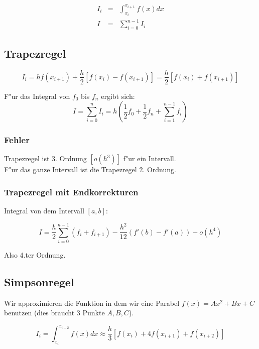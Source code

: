 \documentclass[german, 10pt, a4paper, twocolumn]{scrartcl}
\begin{document}
\begin{eqnarray}
	I_i &	= &	\int^{x_{i+1}}_{x_i} f(x) dx \nonumber \\
	I &	= &	\sum^{n-1}_{i=0} I_i \nonumber
\end{eqnarray}

\subsection{Trapezregel}

\begin{displaymath}
	I_i = h f(x_{i+1})+\frac{h}{2}[f(x_i)-f(x_{i+1})]= \frac{h}{2}[f(x_i)+f(x_{i+1})]
\end{displaymath}

F"ur das Integral von $f_0$ bis $f_n$ ergibt sich:
\begin{displaymath}
	I = \sum^n_{i=0} I_i = h \left ( \frac{1}{2}f_0 + \frac{1}{2}f_n+ \sum^{n-1}_{i=1}f_i \right )
\end{displaymath}

\subsubsection{Fehler}

Trapezregel ist 3. Ordnung $[o(h^3)]$ f"ur ein Intervall.\\

F"ur das ganze Intervall ist die Trapezregel 2. Ordnung.

\subsubsection{Trapezregel mit Endkorrekturen}

Integral von dem Intervall $[a,b]$:

\begin{displaymath}
	I = \frac{h}{2}\sum^{n-1}_{i=0} (f_i + f_{i+1})-\frac{h^2}{12}(f'(b)-f'(a))+o(h^4)
\end{displaymath}

Also 4.ter Ordnung.

\subsection{Simpsonregel}

Wir approximieren die Funktion in dem wir eine Parabel $f(x)=Ax^2+Bx+C$ benutzen (dies braucht 3 Punkte $A,B,C$).

\begin{displaymath}
	I_i = \int^{x_{i+2}}_{x_i} f(x)dx \approx \frac{h}{3} [f(x_i)+4f(x_{i+1})+f(x_{i+2})]
\end{displaymath}
\end{document}
